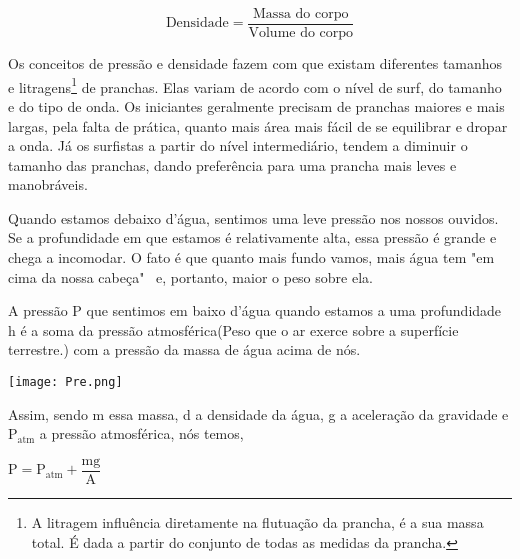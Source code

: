 \documentclass[book, 12pt, twoside, a5paper, english, brazil, sumario=tradicional, openany]{abntex2}
\begin{document}
\vspace{-0.2cm}

\begin{equation}
    \text{Densidade} = \dfrac{\text{Massa do corpo}}{\text{Volume do corpo}}
\end{equation}

Os conceitos de pressão e densidade fazem com que existam diferentes tamanhos e litragens\footnote{A litragem influência diretamente na flutuação da prancha, é a sua massa total. É dada a partir do conjunto de todas as medidas da prancha.} de pranchas. Elas variam de acordo com o nível de surf, do tamanho e do tipo de onda. Os iniciantes geralmente precisam de pranchas maiores e mais largas, pela falta de prática, quanto mais área mais fácil de se equilibrar e dropar a onda. Já os surfistas a partir do nível intermediário, tendem a diminuir o tamanho das pranchas, dando preferência para uma prancha mais leves e manobráveis.

\vspace{-0.44cm}

{}

\vspace{-0.3cm}

Quando estamos debaixo d'água, sentimos uma leve pressão nos nossos ouvidos. Se a profundidade em que estamos é relativamente alta, essa pressão é grande e chega a incomodar. O fato é que quanto mais fundo vamos, mais água tem "em cima da nossa cabeça" \ e, portanto, maior o peso sobre ela.

A pressão P que sentimos em baixo d'água quando estamos a uma profundidade h é a soma da pressão atmosférica(Peso que o ar exerce sobre a superfície terrestre.) com a pressão da massa de água acima de nós.

\vspace{0.5cm}
\begin{center}
    \texttt{[image: Pre.png]} 
\end{center}
\vspace{-0.13cm}

Assim, sendo m essa massa, d a densidade da água, g a aceleração da gravidade e P$_{\text{atm}}$ a pressão atmosférica, nós temos,

\begin{center}
    $\text{P} = \text{P}_{\text{atm}} + \dfrac{\text{mg}}{\text{A}}$
\end{center}
\end{document}
